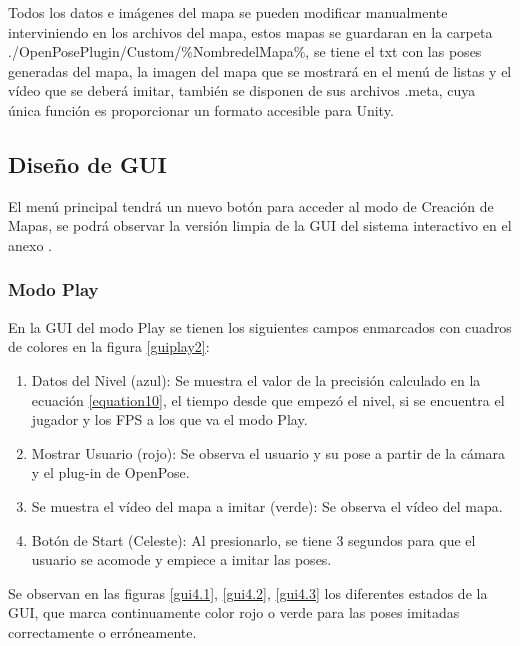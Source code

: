 Todos los datos e imágenes del mapa se pueden modificar manualmente interviniendo en los archivos del mapa, estos mapas se guardaran en la carpeta ./OpenPosePlugin/Custom/\%NombredelMapa\%, se tiene el txt con las poses generadas del mapa, la imagen del mapa que se mostrará en el menú de listas y el vídeo que se deberá imitar, también se disponen de sus archivos .meta, cuya única función es proporcionar un formato accesible para Unity.

\subsection{Diseño de GUI}

El menú principal tendrá un nuevo botón para acceder al modo de Creación de Mapas, se podrá observar la versión limpia de la GUI del sistema interactivo en el anexo .

\subsubsection{Modo Play}

En la GUI del modo Play se tienen los siguientes campos enmarcados con cuadros de colores en la figura \ref{guiplay2}:
\begin{enumerate}
	\item Datos del Nivel (azul): Se muestra el valor de la precisión calculado en la ecuación \ref{equation10}, el tiempo desde que empezó el nivel, si se encuentra el jugador y los FPS a los que va el modo Play.
	\item Mostrar Usuario (rojo): Se observa el usuario y su pose a partir de la cámara y el plug-in de OpenPose.
	\item Se muestra el vídeo del mapa a imitar (verde): Se observa el vídeo del mapa.
	\item Botón de Start (Celeste): Al presionarlo, se tiene 3 segundos para que el usuario se acomode y empiece a imitar las poses.
\end{enumerate}

Se observan en las figuras \ref{gui4.1}, \ref{gui4.2}, \ref{gui4.3} los diferentes estados de la GUI, que marca continuamente color rojo o verde para las poses imitadas correctamente o erróneamente.

